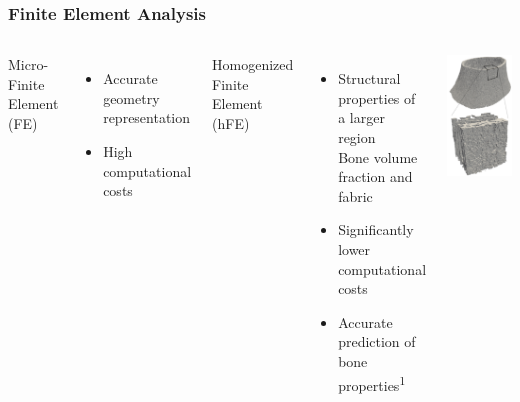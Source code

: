\documentclass[xcolor=table,11pt]{beamer}
\begin{document}
	\begin{frame}
		\frametitle{Finite Element Analysis}
		\begin{columns}
			Micro-Finite Element (\textmu FE)
			\begin{itemize}
				\item Accurate geometry representation
				\item High computational costs
			\end{itemize}
			\vspace{5mm}
			Homogenized Finite Element (hFE)
			\begin{itemize}
				\item Structural properties of a larger region\\Bone volume fraction and fabric
				\item Significantly lower computational costs
				\item Accurate prediction of bone properties\textsuperscript{1}
			\end{itemize}
			\centering
			\includegraphics[width=\linewidth]{Figures/HighResCT.png}

\end{columns}
\end{frame}
\end{document}
